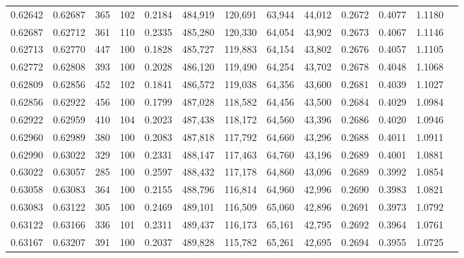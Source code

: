 \begin{tabular}{rrrrrrrrrrrrr}
0.62642 & 0.62687 &   365 & 102 &                                     0.2184 & 484,919 & 120,691 &  63,944 &  44,012 & 0.2672 & 0.4077 & 1.1180 \\
0.62687 & 0.62712 &   361 & 110 &                                     0.2335 & 485,280 & 120,330 &  64,054 &  43,902 & 0.2673 & 0.4067 & 1.1146 \\
0.62713 & 0.62770 &   447 & 100 &                                     0.1828 & 485,727 & 119,883 &  64,154 &  43,802 & 0.2676 & 0.4057 & 1.1105 \\
0.62772 & 0.62808 &   393 & 100 &                                     0.2028 & 486,120 & 119,490 &  64,254 &  43,702 & 0.2678 & 0.4048 & 1.1068 \\
0.62809 & 0.62856 &   452 & 102 &                                     0.1841 & 486,572 & 119,038 &  64,356 &  43,600 & 0.2681 & 0.4039 & 1.1027 \\
0.62856 & 0.62922 &   456 & 100 &                                     0.1799 & 487,028 & 118,582 &  64,456 &  43,500 & 0.2684 & 0.4029 & 1.0984 \\
0.62922 & 0.62959 &   410 & 104 &                                     0.2023 & 487,438 & 118,172 &  64,560 &  43,396 & 0.2686 & 0.4020 & 1.0946 \\
0.62960 & 0.62989 &   380 & 100 &                                     0.2083 & 487,818 & 117,792 &  64,660 &  43,296 & 0.2688 & 0.4011 & 1.0911 \\
0.62990 & 0.63022 &   329 & 100 &                                     0.2331 & 488,147 & 117,463 &  64,760 &  43,196 & 0.2689 & 0.4001 & 1.0881 \\
0.63022 & 0.63057 &   285 & 100 &                                     0.2597 & 488,432 & 117,178 &  64,860 &  43,096 & 0.2689 & 0.3992 & 1.0854 \\
0.63058 & 0.63083 &   364 & 100 &                                     0.2155 & 488,796 & 116,814 &  64,960 &  42,996 & 0.2690 & 0.3983 & 1.0821 \\
0.63083 & 0.63122 &   305 & 100 &                                     0.2469 & 489,101 & 116,509 &  65,060 &  42,896 & 0.2691 & 0.3973 & 1.0792 \\
0.63122 & 0.63166 &   336 & 101 &                                     0.2311 & 489,437 & 116,173 &  65,161 &  42,795 & 0.2692 & 0.3964 & 1.0761 \\
0.63167 & 0.63207 &   391 & 100 &                                     0.2037 & 489,828 & 115,782 &  65,261 &  42,695 & 0.2694 & 0.3955 & 1.0725 \\

\end{tabular}
